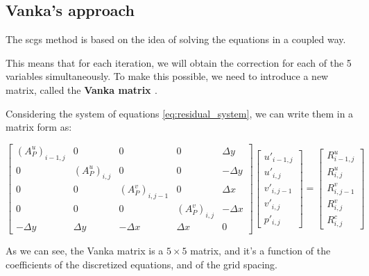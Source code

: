 \subsection{Vanka's approach}
\label{subsec:vanka_approach}

The \acrshort{scgs} method is based on the idea of solving the equations in a coupled way.

This means that for each iteration, we will obtain the correction for each of the 5 variables simultaneously.
To make this possible, we need to introduce a new matrix, called the \textbf{Vanka matrix \cite{VANKA1986138}}.

Considering the system of equations \ref{eq:residual_system}, we can write them in a matrix form as:

\begin{equation}
    \begin{bmatrix}
        (A_P^u)_{i-1,j} & 0             & 0               & 0             & \Delta y  \\
        0               & (A_P^u)_{i,j} & 0               & 0             & -\Delta y \\
        0               & 0             & (A_P^v)_{i,j-1} & 0             & \Delta x  \\
        0               & 0             & 0               & (A_P^v)_{i,j} & -\Delta x \\
        -\Delta y       & \Delta y      & -\Delta x       & \Delta x      & 0
    \end{bmatrix}
    \begin{bmatrix}
        u'_{i-1,j} \\
        u'_{i,j}   \\
        v'_{i,j-1} \\
        v'_{i,j}   \\
        p'_{i,j}
    \end{bmatrix}
    =
    \begin{bmatrix}
        R_{i-1,j}^u \\
        R_{i,j}^u   \\
        R_{i,j-1}^v \\
        R_{i,j}^v   \\
        R_{i,j}^c
    \end{bmatrix}
    \label{eq:vanka_matrix}
\end{equation}

As we can see, the Vanka matrix is a $5 \times 5$ matrix, and it's a function of the coefficients of the discretized equations, and of the grid spacing.

